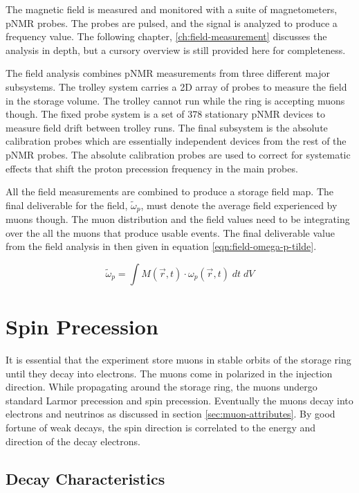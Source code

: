 The magnetic field is measured and monitored with a suite of magnetometers, pNMR probes.  The probes are pulsed, and the signal is analyzed to produce a frequency value. The following chapter, \ref{ch:field-measurement} discusses the analysis in depth, but a cursory overview is still provided here for completeness.  

The field analysis combines pNMR measurements from three different major subsystems.  The trolley system carries a 2D array of probes to measure the field in the storage volume.  The trolley cannot run while the ring is accepting muons though.  The fixed probe system is a set of 378 stationary pNMR devices to measure field drift between trolley runs.  The final subsystem is the absolute calibration probes which are essentially independent devices from the rest of the pNMR probes.  The absolute calibration probes are used to correct for systematic effects that shift the proton precession frequency in the main probes.  

All the field measurements are combined to produce a storage field map.  The final deliverable for the field, $\tilde{\omega}_p$, must denote the average field experienced by muons though.  The muon distribution and the field values need to be integrating over the all the muons that produce usable events.  The final deliverable value from the field analysis in then given in equation \ref{eqn:field-omega-p-tilde}.

\begin{equation}
\label{eqn:field-omega-p-tilde}
\tilde{\omega}_p = \int M(\vec{r}, t) \cdot \omega_p(\vec{r}, t)\; dt\;dV
\end{equation}


\section{Spin Precession} \label{sec:spin-precession}

It is essential that the experiment store muons in stable orbits of the storage ring until they decay into electrons.  The muons come in polarized in the injection direction.  While propagating around the storage ring, the muons undergo standard Larmor precession and spin precession.  Eventually the muons decay into electrons and neutrinos as discussed in section \ref{sec:muon-attributes}. By good fortune of weak decays, the spin direction is correlated to the energy and direction of the decay electrons.

\subsection{Decay Characteristics}

